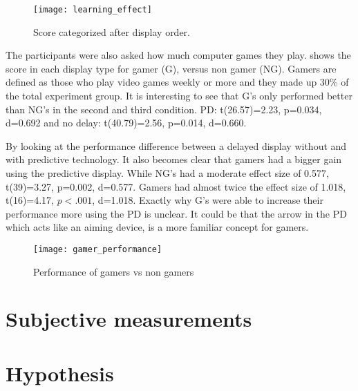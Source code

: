 \begin{figure}[h!]
    \centering
    \texttt{[image: learning\_effect]}
    \caption{Score categorized after display order.}
    \label{learning_effect}
\end{figure}

The participants were also asked how much computer games they play.  shows the score in each display type for gamer (G), versus non gamer (NG). Gamers are defined as those who play video games weekly or more and they made up 30\% of the total experiment group. It is interesting to see that G's only performed better than NG's in the second and third condition. PD: t(26.57)=2.23, p=0.034, d=0.692 and no delay: t(40.79)=2.56, p=0.014, d=0.660.

By looking at the performance difference between a delayed display without and with predictive technology. It also becomes clear that gamers had a bigger gain using the predictive display. While NG's had a moderate effect size of 0.577, t(39)=3.27, p=0.002, d=0.577. Gamers had almost twice the effect size of 1.018, t(16)=4.17, $p<.001$, d=1.018. Exactly why G's were able to increase their performance more using the PD is unclear. It could be that the arrow in the PD which acts like an aiming device, is a more familiar concept for gamers.


\begin{figure}[h!]
    \centering
    \texttt{[image: gamer\_performance]}
    \caption{Performance of gamers vs non gamers}
    \label{gamer_performance}
\end{figure}


\section{Subjective measurements}




\section{Hypothesis}


